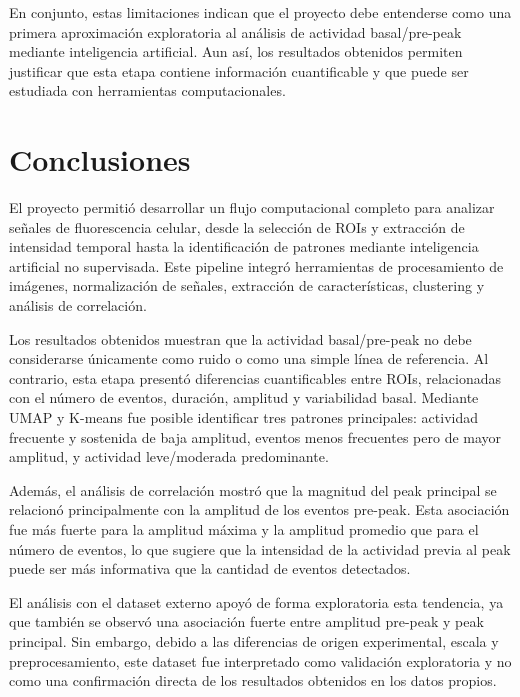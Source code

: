 \documentclass[10pt,twocolumn]{article}
\begin{document}
En conjunto, estas limitaciones indican que el proyecto debe entenderse como una primera aproximación exploratoria al análisis de actividad basal/pre-peak mediante inteligencia artificial. Aun así, los resultados obtenidos permiten justificar que esta etapa contiene información cuantificable y que puede ser estudiada con herramientas computacionales.

\section{Conclusiones}

El proyecto permitió desarrollar un flujo computacional completo para analizar señales de fluorescencia celular, desde la selección de ROIs y extracción de intensidad temporal hasta la identificación de patrones mediante inteligencia artificial no supervisada. Este pipeline integró herramientas de procesamiento de imágenes, normalización de señales, extracción de características, clustering y análisis de correlación.

Los resultados obtenidos muestran que la actividad basal/pre-peak no debe considerarse únicamente como ruido o como una simple línea de referencia. Al contrario, esta etapa presentó diferencias cuantificables entre ROIs, relacionadas con el número de eventos, duración, amplitud y variabilidad basal. Mediante UMAP y K-means fue posible identificar tres patrones principales: actividad frecuente y sostenida de baja amplitud, eventos menos frecuentes pero de mayor amplitud, y actividad leve/moderada predominante.

Además, el análisis de correlación mostró que la magnitud del peak principal se relacionó principalmente con la amplitud de los eventos pre-peak. Esta asociación fue más fuerte para la amplitud máxima y la amplitud promedio que para el número de eventos, lo que sugiere que la intensidad de la actividad previa al peak puede ser más informativa que la cantidad de eventos detectados.

El análisis con el dataset externo apoyó de forma exploratoria esta tendencia, ya que también se observó una asociación fuerte entre amplitud pre-peak y peak principal. Sin embargo, debido a las diferencias de origen experimental, escala y preprocesamiento, este dataset fue interpretado como validación exploratoria y no como una confirmación directa de los resultados obtenidos en los datos propios.
\end{document}
